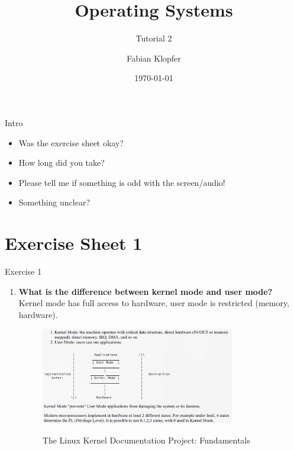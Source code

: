 \documentclass[10pt]{beamer}
\title{\textbf{Operating Systems}}
\subtitle{Tutorial 2}
\author{Fabian Klopfer}
\date{\today}
\begin{document}
\frame{\titlepage}


\begin{frame}{Intro}
\begin{itemize}
 \item Was the exercise sheet okay?
 \item How long did you take?
 \item Please tell me if something is odd with the screen/audio!
 \item Something unclear?
\end{itemize}
\end{frame}

\section{Exercise Sheet 1}
\frame{\sectionpage}
\begin{frame}[allowframebreaks]{Exercise 1}
    	\begin{enumerate}
        \item \textbf{What is the difference between kernel mode and user mode?} \\
        Kernel mode has full access to hardware, user mode is restricted (memory, hardware). \\
        \begin{figure}
         \includegraphics[keepaspectratio, width=0.8\textwidth, height=0.8\textheight-2\baselineskip-2\baselineskip]{img/000_tldp_kernel_user.png} \\
         \caption{The Linux Kernel Documentation Project: Fundamentals~\autocite{tldp_user_kernel}}
        \end{figure}
        \framebreak
        

\end{enumerate}
\end{frame}
\end{document}
